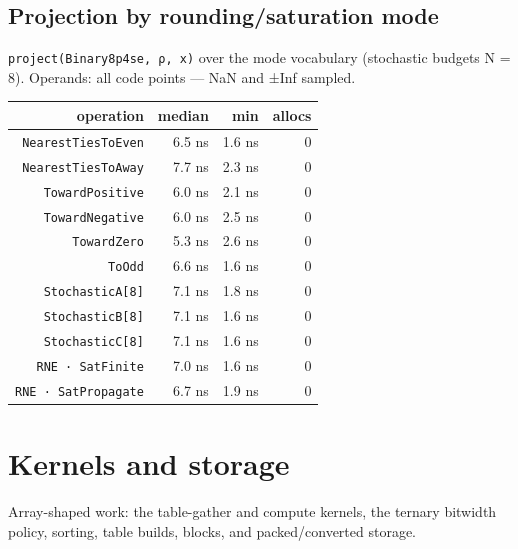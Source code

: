 \subsection{Projection by rounding/saturation mode}



\label{15662701981835679547}{}


\texttt{project(Binary8p4se, ρ, x)} over the mode vocabulary (stochastic budgets N = 8). Operands: all code points — NaN and ±Inf sampled.




\begin{table}[h]
\centering
\begin{tabulary}{\linewidth}{R R R R}
\toprule
operation & median & min & allocs \\
\toprule
\texttt{NearestTiesToEven} & 6.5 ns & 1.6 ns & 0 \\
\texttt{NearestTiesToAway} & 7.7 ns & 2.3 ns & 0 \\
\texttt{TowardPositive} & 6.0 ns & 2.1 ns & 0 \\
\texttt{TowardNegative} & 6.0 ns & 2.5 ns & 0 \\
\texttt{TowardZero} & 5.3 ns & 2.6 ns & 0 \\
\texttt{ToOdd} & 6.6 ns & 1.6 ns & 0 \\
\texttt{StochasticA[8]} & 7.1 ns & 1.8 ns & 0 \\
\texttt{StochasticB[8]} & 7.1 ns & 1.6 ns & 0 \\
\texttt{StochasticC[8]} & 7.1 ns & 1.6 ns & 0 \\
\texttt{RNE · SatFinite} & 7.0 ns & 1.6 ns & 0 \\
\texttt{RNE · SatPropagate} & 6.7 ns & 1.9 ns & 0 \\
\bottomrule
\end{tabulary}

\end{table}



\section{Kernels and storage}



\label{9956393270762268485}{}


Array-shaped work: the table-gather and compute kernels, the ternary bitwidth policy, sorting, table builds, blocks, and packed/converted storage.



